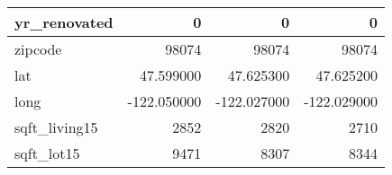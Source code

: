 \begin{table}[H]
\begin{tabular}{|l|r|r|r|}
\hline yr\_renovated & \cellcolor[rgb]{0.9, 0.54, 0.52} 0 & \cellcolor[rgb]{0.9, 0.54, 0.52} 0 & \cellcolor[rgb]{0.9, 0.54, 0.52} 0 \\
\hline zipcode & \cellcolor[rgb]{0.9, 0.54, 0.52} 98074 & \cellcolor[rgb]{0.9, 0.54, 0.52} 98074 & \cellcolor[rgb]{0.9, 0.54, 0.52} 98074 \\
\hline lat & \cellcolor[rgb]{0.9, 0.54, 0.52} 47.599000 & 47.625300 & 47.625200 \\
\hline long & \cellcolor[rgb]{0.9, 0.54, 0.52} -122.050000 & \cellcolor[rgb]{0.9, 0.54, 0.52} -122.027000 & \cellcolor[rgb]{0.9, 0.54, 0.52} -122.029000 \\
\hline sqft\_living15 & \cellcolor[rgb]{0.9, 0.54, 0.52} 2852 & 2820 & 2710 \\
\hline sqft\_lot15 & \cellcolor[rgb]{0.9, 0.54, 0.52} 9471 & 8307 & 8344 \\
\hline
\end{tabular}
\end{table}
